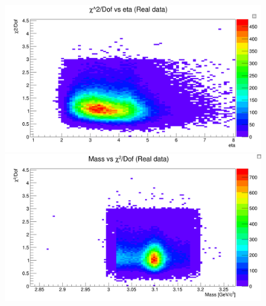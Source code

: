 \begin{figure}[H]    
\begin{minipage}[t]{0.5\textwidth}
\includegraphics[width=\linewidth]{rozdzial6/JPsi_eta_chi2_data.png}
\end{minipage}
\hspace{\fill}
\begin{minipage}[t]{0.5\textwidth}
\includegraphics[width=\linewidth]{rozdzial6/JPsi_mass_chi2_data.png}
\end{minipage}


\end{figure}
